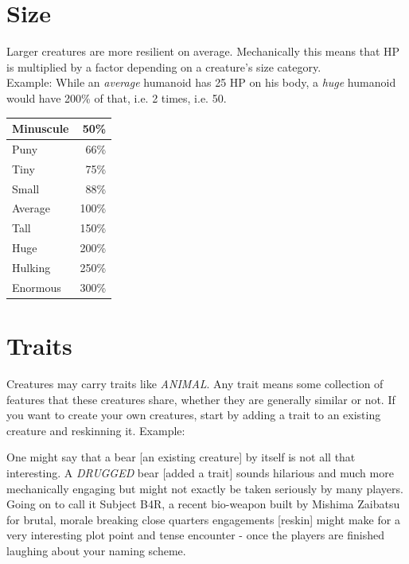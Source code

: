 \documentclass[12pt,a4paper,openany,usenames,dvipsnames]{book}
\begin{document}
	\section{Size}
	Larger creatures are more resilient on average. Mechanically this means that HP is multiplied by a factor depending on a creature's size category.\\
	Example: While an \emph{average} humanoid has 25 HP on his body, a \emph{huge} humanoid would have 200\% of that, i.e. 2 times, i.e. 50.\\
	\begin{center}
	\begin{tabular}{|l|r|}
		\hline
		Minuscule &  50\% \\ \hline
		Puny      &  66\% \\ \hline
		Tiny      &  75\% \\ \hline
		Small     &  88\% \\ \hline
		Average   & 100\% \\ \hline
		Tall      & 150\% \\ \hline
		Huge      & 200\% \\ \hline
		Hulking   & 250\% \\ \hline
		Enormous  & 300\% \\ \hline
	\end{tabular}
	\end{center}

	\section{Traits}
	Creatures may carry traits like \emph{ANIMAL}.
	Any trait means some collection of features that these creatures share,
		whether they are generally similar or not.
	If you want to create your own creatures,
		start by adding a trait to an existing creature and reskinning it.
	Example:\par
	\begin{exampleblock}
		One might say that a bear [an existing creature] by itself is not all that interesting. A \emph{DRUGGED} bear [added a trait] sounds hilarious and much more mechanically engaging but might not exactly be taken seriously by many players.\\
		Going on to call it Subject B4R, a recent bio-weapon built by Mishima Zaibatsu for brutal, morale breaking close quarters engagements [reskin] might make for a very interesting plot point and tense encounter - once the players are finished laughing about your naming scheme.
	\end{exampleblock}
	
\end{document}
